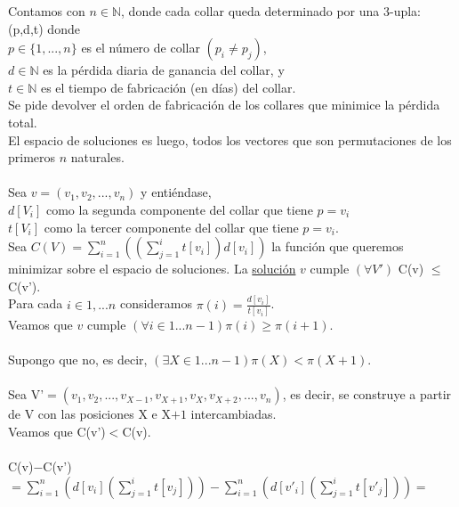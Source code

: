 \documentclass[11pt, a4paper, twoside]{article}
\begin{document}
Contamos con $n \in \mathbb{N}$, donde cada collar queda determinado por una $3$-upla: (p,d,t) donde \\
$p \in \{1,...,n\}$ es el número de collar $(p_i \neq p_j)$, \\
$d \in \mathbb{N}$ es la pérdida diaria de ganancia del collar, y \\
$t \in \mathbb{N}$ es el tiempo de fabricación (en días) del collar. \\
Se pide devolver el orden de fabricación de los collares que minimice la pérdida total. \\
El espacio de soluciones es luego, todos los vectores que son permutaciones de los primeros $n$ naturales. \\
\\
Sea $v = (v_1,v_2,...,v_n)$ y entiéndase, \\
$d[V_i]$ como la segunda componente del collar que tiene $p=v_i$ \\
$t[V_i]$ como la tercer componente del collar que tiene $p=v_i$. \\
Sea $\displaystyle{C(V)= \sum_{i=1}^{n} ((\sum_{j=1}^{i} t[v_i])d[v_i])}$ la función que queremos minimizar sobre el espacio de soluciones. La \underline{solución} $v$ cumple $(\forall V')$ C(v) $\le$ C(v').\\
Para cada $i \in 1,...n$ consideramos $\displaystyle{ \pi(i)= \frac{d[v_i]}{t[v_i]}}$. \\
Veamos que $v$ cumple $\displaystyle{(\forall i \in 1...n-1) \pi(i) \ge \pi(i+1)}$. \\
\\
Supongo que no, es decir, $\displaystyle{(\exists X \in 1...n-1) \pi(X) < \pi(X+1)}$. \\
\\
Sea V'$=(v_1,v_2,...,v_{X-1},v_{X+1},v_X,v_{X+2},...,v_n)$, es decir, se construye a partir de V con las posiciones X e X$+1$ intercambiadas. \\
Veamos que C(v')$<$C(v). \\
\\
C(v)$-$C(v')$= \displaystyle {\sum_{i=1}^{n} (d[v_i](\sum_{j=1}^{i} t[v_j]))- \sum_{i=1}^{n}(d[v'_i](\sum_{j=1}^{i} t[v'_j]))} = $\\
\end{document}
